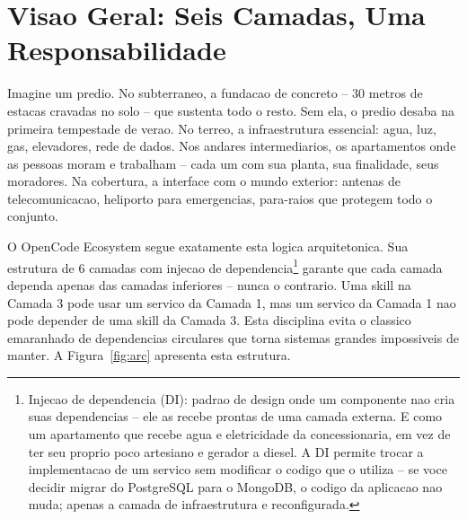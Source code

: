 \documentclass[12pt,a4paper,oneside,sumario=tradicional,chapter=TITLE,section=TITLE,subsection=TITLE,english,brazil]{abntex2}
\begin{document}
\section{Visao Geral: Seis Camadas, Uma Responsabilidade}

Imagine um predio. No subterraneo, a fundacao de concreto -- 30 metros de estacas cravadas no solo -- que sustenta todo o resto. Sem ela, o predio desaba na primeira tempestade de verao. No terreo, a infraestrutura essencial: agua, luz, gas, elevadores, rede de dados. Nos andares intermediarios, os apartamentos onde as pessoas moram e trabalham -- cada um com sua planta, sua finalidade, seus moradores. Na cobertura, a interface com o mundo exterior: antenas de telecomunicacao, heliporto para emergencias, para-raios que protegem todo o conjunto.

O OpenCode Ecosystem segue exatamente esta logica arquitetonica. Sua estrutura de 6 camadas com injecao de dependencia\footnote{Injecao de dependencia (DI): padrao de design onde um componente nao cria suas dependencias -- ele as recebe prontas de uma camada externa. E como um apartamento que recebe agua e eletricidade da concessionaria, em vez de ter seu proprio poco artesiano e gerador a diesel. A DI permite trocar a implementacao de um servico sem modificar o codigo que o utiliza -- se voce decidir migrar do PostgreSQL para o MongoDB, o codigo da aplicacao nao muda; apenas a camada de infraestrutura e reconfigurada.} garante que cada camada dependa apenas das camadas inferiores -- nunca o contrario. Uma skill na Camada 3 pode usar um servico da Camada 1, mas um servico da Camada 1 nao pode depender de uma skill da Camada 3. Esta disciplina evita o classico emaranhado de dependencias circulares que torna sistemas grandes impossiveis de manter. A Figura~\ref{fig:arc} apresenta esta estrutura.
\end{document}
